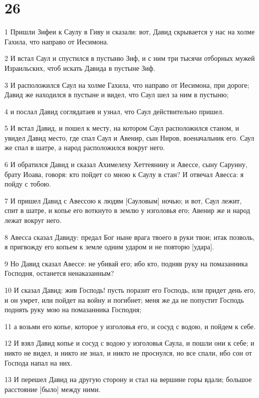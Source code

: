 \chapter{26}

\par 1 Пришли Зифеи к Саулу в Гиву и сказали: вот, Давид скрывается у нас на холме Гахила, что направо от Иесимона.
\par 2 И встал Саул и спустился в пустыню Зиф, и с ним три тысячи отборных мужей Израильских, чтоб искать Давида в пустыне Зиф.
\par 3 И расположился Саул на холме Гахила, что направо от Иесимона, при дороге; Давид же находился в пустыне и видел, что Саул шел за ним в пустыню;
\par 4 и послал Давид соглядатаев и узнал, что Саул действительно пришел.
\par 5 И встал Давид, и пошел к месту, на котором Саул расположился станом, и увидел Давид место, где спал Саул и Авенир, сын Ниров, военачальник его. Саул же спал в шатре, а народ расположился вокруг него.
\par 6 И обратился Давид и сказал Ахимелеху Хеттеянину и Авессе, сыну Саруину, брату Иоава, говоря: кто пойдет со мною к Саулу в стан? И отвечал Авесса: я пойду с тобою.
\par 7 И пришел Давид с Авессою к людям [Сауловым] ночью; и вот, Саул лежит, спит в шатре, и копье его воткнуто в землю у изголовья его; Авенир же и народ лежат вокруг него.
\par 8 Авесса сказал Давиду: предал Бог ныне врага твоего в руки твои; итак позволь, я пригвожду его копьем к земле одним ударом и не повторю [удара].
\par 9 Но Давид сказал Авессе: не убивай его; ибо кто, подняв руку на помазанника Господня, останется ненаказанным?
\par 10 И сказал Давид: жив Господь! пусть поразит его Господь, или придет день его, и он умрет, или пойдет на войну и погибнет; меня же да не попустит Господь поднять руку мою на помазанника Господня;
\par 11 а возьми его копье, которое у изголовья его, и сосуд с водою, и пойдем к себе.
\par 12 И взял Давид копье и сосуд с водою у изголовья Саула, и пошли они к себе; и никто не видел, и никто не знал, и никто не проснулся, но все спали, ибо сон от Господа напал на них.
\par 13 И перешел Давид на другую сторону и стал на вершине горы вдали; большое расстояние [было] между ними.
